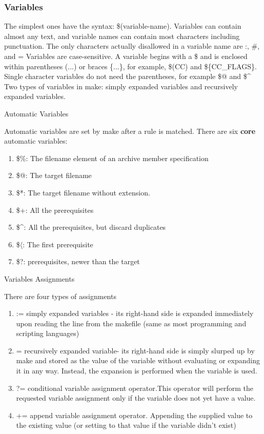 \subsubsection{Variables}%
\label{ssub:make_variables}

The simplest ones have the syntax: \$(variable-name).
Variables can contain almost any text, and variable names can contain most characters including punctuation.
The only characters actually disallowed in a variable name are :, \#, and =
Variables are case-sensitive.
A variable begins with a \$ and is enclosed within parentheses (...) or braces \{...\}, for example, \$(CC) and \$\{CC\_FLAGS\}.
Single character variables do not need the parentheses, for example \$@ and \$\^{}
Two types of variables in make: simply expanded variables and recursively expanded variables.

Automatic Variables

Automatic variables are set by make after a rule is matched.
There are six \textbf{core} automatic variables:

\begin{enumerate}
  \item \$\%: The filename element of an archive member specification
  \item \$@: The target filename
  \item \$*: The target filename without extension.
  \item \$+: All the prerequisites
  \item \$\^{}: All the prerequisites, but discard duplicates
  \item \$$\langle$: The first prerequisite
  \item \$?: prerequisites, newer than the target
\end{enumerate}

Variables Assignments

There are four types of assignments
\begin{enumerate}
  \item :=  simply expanded variables - its right-hand side is expanded immediately upon reading the line from the makefile (same as most programming and scripting languages)
  \item = recursively expanded variable- its right-hand side is simply slurped up by make and stored as the value of the variable without evaluating or expanding it in any way. Instead, the expansion is performed when the variable is used.
  \item ?= conditional variable assignment operator.This operator will perform the requested variable assignment only if the variable does not yet have a value.
  \item += append variable assignment operator. Appending the supplied value to the existing value (or setting to that value if the variable didn't exist)
\end{enumerate}

